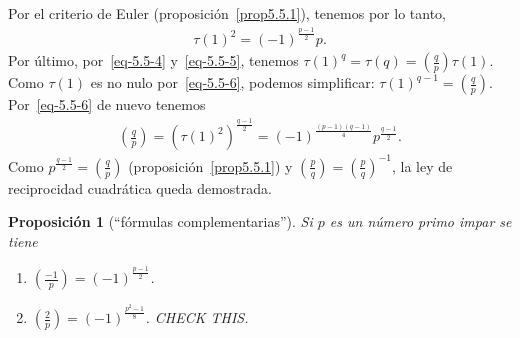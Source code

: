 \documentclass[bibtotoc,leqno,spanish]{amsbook}
\newcommand{\leg}[2]{\left(\frac{#1}{#2}\right)}
\numberwithin{equation}{section}
\theoremstyle{note}
\theoremstyle{note}
\newtheorem{proposition}{Proposici\'on}
\theoremstyle{rem}
\numberwithin{theorem}{section}
\numberwithin{proposition}{section}
\numberwithin{definition}{section}
\numberwithin{lemma}{section}
\numberwithin{corollary}{section}
\numberwithin{example}{section}
\numberwithin{footnote}{section}%
\begin{document}
Por el criterio de Euler (proposici\'on~\ref{prop5.5.1}), tenemos por lo tanto,
\begin{gather}\label{eq-5.5-6}
\tau(1)^{2}=(-1)^{\frac{p-1}{2}}p.
\end{gather}
Por \'ultimo, por~\eqref{eq-5.5-4} y~\eqref{eq-5.5-5}, tenemos $\tau(1)^{q}=\tau(q)=\leg{q}{p}\tau(1)$. Como
$\tau(1)$ es no nulo por~\eqref{eq-5.5-6}, podemos simplificar: $\tau(1)^{q-1}=\leg{q}{p}$. Por~\eqref{eq-5.5-6}
de nuevo tenemos
\begin{gather*}
\leg{q}{p}=(\tau(1)^{2})^{\frac{q-1}{2}}=(-1)^{\frac{(p-1)(q-1)}{4}}p^{\frac{q-1}{2}}.
\end{gather*}
Como $p^{\frac{q-1}{2}}=\leg{q}{p}$ (proposici\'on~\ref{prop5.5.1})
y $\leg{p}{q} = \leg{p}{q}^{-1}$, la ley de reciprocidad
cuadr\'atica queda demostrada.

\begin{proposition}[``f\'ormulas complementarias'']\label{prop5.5.2}
Si $p$ es un n\'umero primo impar se tiene
\begin{enumerate}
\item $\leg{-1}{p}=(-1)^{\frac{p-1}{2}}$.
\item $\leg{2}{p} = (-1)^{\frac{p^{2}-1}{8}}$. CHECK THIS.
\end{enumerate}
\end{proposition}
\end{document}

